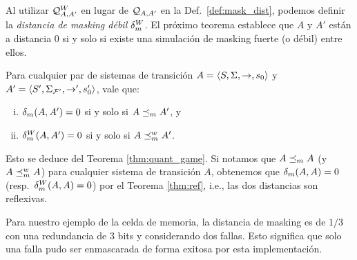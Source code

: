 Al utilizar $\mathcal{Q}^W_{A,A'}$ en lugar de $\mathcal{Q}_{A, A'}$ en la 
Def.~\ref{def:mask_dist}, podemos definir la \emph{distancia de masking débil} $\delta_{m}^W$. El próximo teorema establece que $A$ y
$A'$ están a distancia $0$ si y solo si existe una simulación de masking fuerte (o débil) entre ellos.

\begin{theorem}\label{thm:ref}
  Para cualquier par de sistemas de transición $A = \langle S, \Sigma, \rightarrow, s_0 \rangle$ y $A' = \langle S', \Sigma_{\mathcal{F'}}, \rightarrow', s'_0 \rangle$, vale que:
  \begin{enumerate}[(i)]
  \item  $\delta_{m}(A,A') = 0$ si y solo si $A \preceq_{m} A'$, y
   \item $\delta_{m}^W(A,A') = 0$ si y solo si $A \preceq^w_{m} A' $.
  \end{enumerate}
\end{theorem}
%
Esto se deduce del Teorema \ref{thm:quant_game}.
Si notamos que $A \preceq_{m} A$ (y $A \preceq^w_{m} A$) para cualquier sistema de transición $A$, obtenemos que $\delta_{m}(A,A)=0$ (resp.\ $\delta_{m}^W(A,A)=0$) por el Teorema \ref{thm:ref}, i.e., 
las dos distancias son reflexivas.

Para nuestro ejemplo de la celda de memoria, la distancia de masking es de $1/3$ 
con una redundancia de $3$ bits y considerando dos fallas. 
Esto significa que solo una falla pudo ser enmascarada de forma exitosa por esta implementación. \\


